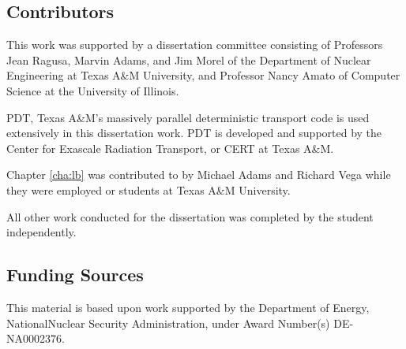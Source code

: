 \subsection*{Contributors}
This work was supported by a dissertation committee consisting of Professors Jean Ragusa, Marvin Adams, and Jim Morel of the Department of Nuclear Engineering at Texas A\&M University, and Professor Nancy Amato of Computer Science at the University of Illinois.

PDT, Texas A\&M's massively parallel deterministic transport code is used extensively in this dissertation work.
PDT is developed and supported by the Center for Exascale Radiation Transport, or CERT at Texas A\&M.

Chapter \ref{cha:lb} was contributed to by Michael Adams and Richard Vega while they were employed or students at Texas A\&M University. 

All other work conducted for the dissertation was completed by the student independently.
\subsection*{Funding Sources}
This material is based upon work supported by the Department of Energy, NationalNuclear Security Administration, under Award Number(s) DE-NA0002376.
\pagebreak{}